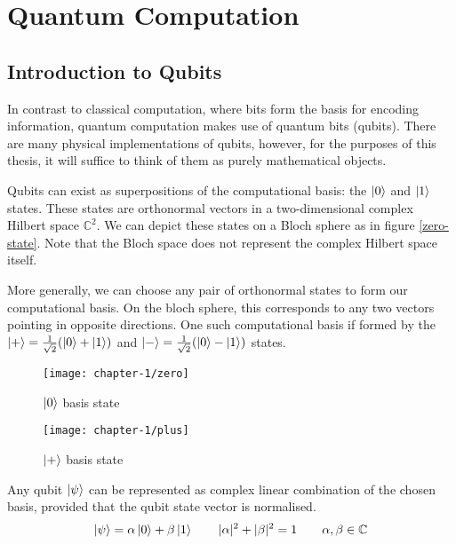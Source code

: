 \section{\label{quantum-computation}Quantum Computation}

\subsection{Introduction to Qubits}

In contrast to classical computation, where bits form the basis for encoding information, quantum computation makes use of quantum bits (qubits). There are many physical implementations of qubits, however, for the purposes of this thesis, it will suffice to think of them as purely mathematical objects.

Qubits can exist as superpositions of the computational basis: the $\ket 0$ and $\ket 1$ states. These states are orthonormal vectors in a two-dimensional complex Hilbert space $\mathbb{C}^2$. We can depict these states on a Bloch sphere as in figure \ref{zero-state}. Note that the Bloch space does not represent the complex Hilbert space itself.

More generally, we can choose any pair of orthonormal states to form our computational basis. On the bloch sphere, this corresponds to any two vectors pointing in opposite directions. One such computational basis if formed by the $\ket + = \frac{1}{\sqrt{2}} (\ket 0 + \ket 1)$ and $\ket - = \frac{1}{\sqrt{2}} (\ket 0 - \ket 1)$ states.

\begin{figure}[H]
\centering
    \begin{minipage}{.4\textwidth}
      \centering
      \texttt{[image: chapter-1/zero]}
      \caption{$\ket 0$ basis state}
      \label{zero-state}
    \end{minipage}%
    \begin{minipage}{.4\textwidth}
      \centering
      \texttt{[image: chapter-1/plus]}
      \caption{$\ket +$ basis state}
      \label{plus-state}
    \end{minipage}
\end{figure}
Any qubit $\ket\psi$ can be represented as complex linear combination of the chosen basis, provided that the qubit state vector is normalised.
\begin{equation*}
\begin{gathered}
    \ket \psi = \alpha\ket 0 + \beta\ket 1 \qquad
    |\alpha|^2 + |\beta|^2 = 1 \qquad
    \alpha, \beta \in \mathbb{C}
\end{gathered}
\end{equation*}

